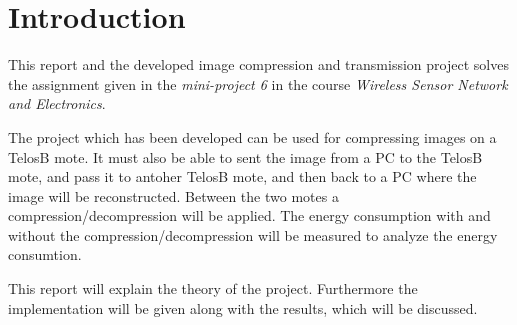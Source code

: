 \chapter{Introduction}
\label{chp:intro}

This report and the developed image compression and transmission project solves the assignment given in the \emph{mini-project 6} in the course \emph{Wireless Sensor Network and Electronics}.

The project which has been developed can be used for compressing images on a TelosB mote. It must also be able to sent the image from a PC to the TelosB mote, and pass it to antoher TelosB mote, and then back to a PC where the image will be reconstructed. Between the two motes a compression/decompression will be applied. The energy consumption with and without the compression/decompression will be measured to analyze the energy consumtion.

This report will explain the theory of the project. Furthermore the implementation will be given along with the results, which will be discussed.